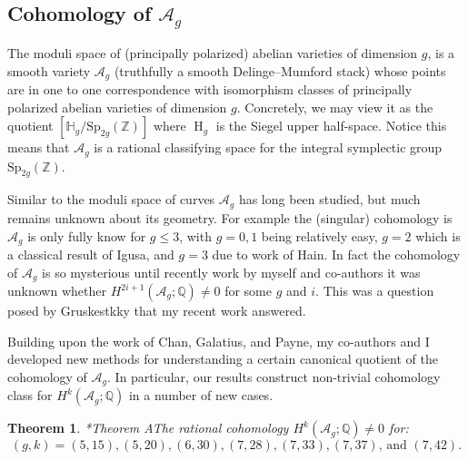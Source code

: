 \documentclass[11pt,reqno]{amsart}
\newtheorem{theorem}[lemma]{Theorem}
\theoremstyle{remark}
\renewcommand{\H}{\operatorname{H}}
\newcommand{\cA}{\mathcal{A}}
\newcommand{\cM}{\mathcal{M}}
\newcommand{\Q}{\mathbb{Q}}
\newcommand{\Z}{\mathbb{Z}}
\begin{document}





\subsection{Cohomology of $\cA_{g}$}

The moduli space of (principally polarized) abelian varieties of dimension $g$, is a smooth variety $\cA_{g}$ (truthfully a smooth Delinge--Mumford stack) whose points are in one to one correspondence with isomorphism classes of principally polarized abelian varieties of dimension $g$. Concretely, we may view it as the quotient $[\mathbb{H}_g/\mathrm{Sp}_{2g}(\Z)]$ where $\H_{g}$ is the Siegel upper half-space. Notice this means that $\cA_{g}$  is a rational classifying space for the integral symplectic group $\mathrm{Sp}_{2g}(\Z)$. 

Similar to the moduli space of curves $\cA_{g}$ has long been studied, but much remains unknown about its geometry. For example the (singular) cohomology is $\cA_{g}$ is only fully know for $g\leq 3$, with $g=0,1$ being relatively easy, $g=2$ which is a classical result of Igusa, and $g=3$ due to work of Hain. In fact the cohomology of $\cA_{g}$ is so mysterious until recently work by myself and co-authors it was unknown whether $H^{2i+1}(\cA_{g};\Q)\neq0$ for some $g$ and $i$. This was a question posed by Gruskestkky that my recent work answered. 

Building upon the work of Chan, Galatius, and Payne, my co-authors and I developed new methods for understanding a certain canonical quotient of the cohomology of $\cA_{g}$. In particular, our results construct non-trivial cohomology class for $H^{k}(\cA_{g}; \Q)$ in a number of new cases. 

\begin{theorem}\cite{BBCMMW22}*{Theorem A}\label{thm:Ag}
The rational cohomology $H^{k}\left(\cA_{g};\Q\right)\neq0$ for:
\[
\text{$(g,k)=(5,15),(5,20),(6,30),(7,28),(7,33),(7,37)$, and $(7,42)$}.
\]
\end{theorem}
\end{document}
